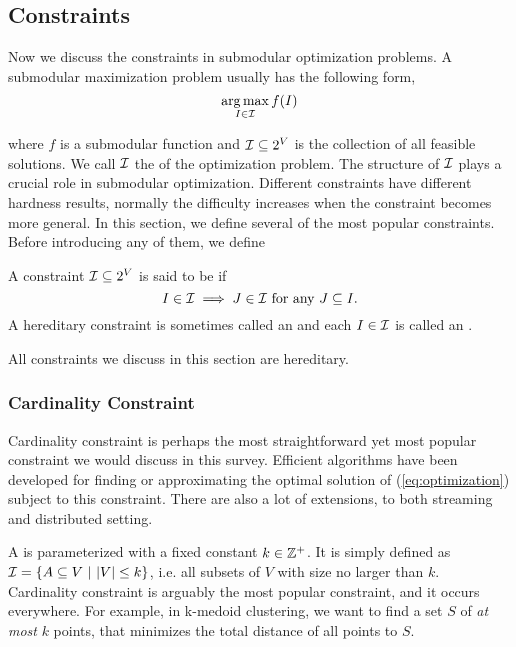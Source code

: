 \subsection{Constraints}
Now we discuss the constraints in submodular optimization problems. A submodular maximization problem usually has the following form,
\begin{equation}
  \label{eq:optimization}
  \operatorname*{arg\,max}_{I\in\mathcal{I}} f(I)
\end{equation}

where $f$ is a submodular function and $\mathcal{I} \subseteq 2^V$ is the collection of all feasible solutions. We call $\mathcal{I}$ the  of the optimization problem. The structure of $\mathcal{I}$ plays a crucial role in submodular optimization. Different constraints have different hardness results, normally the difficulty increases when the constraint becomes more general. In this section, we define several of the most popular constraints. Before introducing any of them, we define
\begin{definition}[Hereditary]
  \label{def:hereditary}
  A constraint $\mathcal{I} \subseteq 2^V$ is said to be  if 
$$I\in\mathcal{I} \implies J\in\mathcal{I} ~\text{for any}~J\subseteq I.$$
A hereditary constraint is sometimes called an  and each $I\in\mathcal{I}$ is called an . 
\end{definition}
All constraints we discuss in this section are hereditary.


\subsubsection{Cardinality Constraint}
Cardinality constraint is perhaps the most straightforward yet most popular constraint we would discuss in this survey. Efficient algorithms have been developed for finding or approximating the optimal solution of (\ref{eq:optimization}) subject to this constraint. There are also a lot of extensions, to both streaming and distributed setting. 

A  is parameterized with a fixed constant $k \in \mathbb{Z}^+$. It is simply defined as $\mathcal{I} = \{A \subseteq V ~|~ |V| \leq k\}$, i.e. all subsets of $V$ with size no larger than $k$. Cardinality constraint is arguably the most popular constraint, and it occurs everywhere. For example, in k-medoid clustering, we want to find a set $S$ of \emph{at most} $k$ points, that minimizes the total distance of all points to $S$.  

